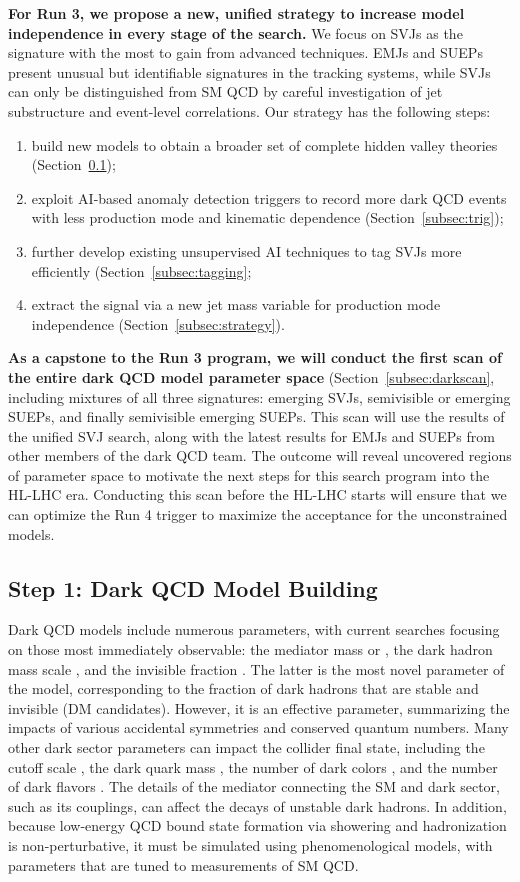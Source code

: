 \textbf{For Run 3, we propose a new, unified strategy to increase model independence in every stage of the search.}
We focus on SVJs as the signature with the most to gain from advanced techniques.
EMJs and SUEPs present unusual but identifiable signatures in the tracking systems,
while SVJs can only be distinguished from SM QCD by careful investigation of jet substructure and event-level correlations.
Our strategy has the following steps:
\begin{enumerate}
\item build new models to obtain a broader set of complete hidden valley theories (Section~\ref{subsec:models});
\item exploit AI-based anomaly detection triggers to record more dark QCD events with less production mode and kinematic dependence (Section~\ref{subsec:trig});
\item further develop existing unsupervised AI techniques to tag SVJs more efficiently (Section~\ref{subsec:tagging};
\item extract the signal via a new jet mass variable for production mode independence (Section~\ref{subsec:strategy}).
\end{enumerate}

\textbf{As a capstone to the Run 3 program, we will conduct the first scan of the entire dark QCD model parameter space} (Section~\ref{subsec:darkscan},
including mixtures of all three signatures: emerging SVJs, semivisible or emerging SUEPs, and finally semivisible emerging SUEPs.
This scan will use the results of the unified SVJ search, along with the latest results for EMJs and SUEPs from other members of the dark QCD team.
The outcome will reveal uncovered regions of parameter space to motivate the next steps for this search program into the HL-LHC era.
Conducting this scan before the HL-LHC starts will ensure that we can optimize the Run 4 trigger to maximize the acceptance for the unconstrained models.

\subsection{Step 1: Dark QCD Model Building}\label{subsec:models}

Dark QCD models include numerous parameters, with current searches focusing on those most immediately observable:
the mediator mass \mZprime or \mbifun, the dark hadron mass scale \mdark, and the invisible fraction \rinv.
The latter is the most novel parameter of the model, corresponding to the fraction of dark hadrons that are stable and invisible (DM candidates).
However, it is an effective parameter, summarizing the impacts of various accidental symmetries and conserved quantum numbers.
Many other dark sector parameters can impact the collider final state, including the cutoff scale \Lamdark, the dark quark mass \mqdark, the number of dark colors \Ncdark, and the number of dark flavors \Nfdark.
The details of the mediator connecting the SM and dark sector, such as its couplings, can affect the decays of unstable dark hadrons.
In addition, because low-energy QCD bound state formation via showering and hadronization is non-perturbative, it must be simulated using phenomenological models,
with parameters that are tuned to measurements of SM QCD.

